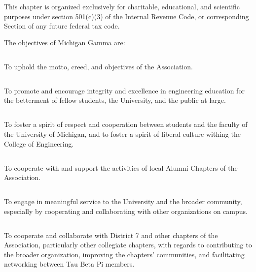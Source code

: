 This chapter is organized exclusively for charitable, educational, and scientific purposes under section 501(c)(3) of the Internal Revenue Code, or corresponding Section of any future federal tax code.

The objectives of Michigan Gamma are:

\subsection{}
To uphold the motto, creed, and objectives of the Association.

\subsection{}
To promote and encourage integrity and excellence in engineering education for the betterment of fellow students, the University, and the public at large.

\subsection{}
To foster a spirit of respect and cooperation between students and the faculty of the University of Michigan, and to foster a spirit of liberal culture withing the College of Engineering.

\subsection{}
To cooperate with and support the activities of local Alumni Chapters of the Association.

\subsection{}
To engage in meaningful service to the University and the broader community, especially by cooperating and collaborating with other organizations on campus.

\subsection{}
To cooperate and collaborate with District 7 and other chapters of the Association, particularly other collegiate chapters, with regards to contributing to the broader organization, improving the chapters' communities, and facilitating networking between Tau Beta Pi members.